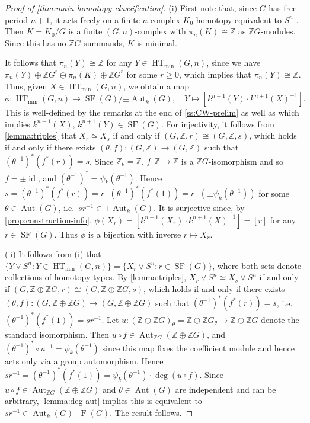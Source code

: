 \documentclass[11pt,leqno,a4paper]{amsart}
\newcommand{\Z}{\mathbb{Z}}
\DeclareMathOperator{\Aut}{Aut}
\DeclareMathOperator{\id}{id}
\DeclareMathOperator{\SF}{SF}
\DeclareMathOperator{\HT}{HT}
\DeclareMathOperator{\FF}{F}
\theoremstyle{definition}
\theoremstyle{remark}
\theoremstyle{custom}
\begin{document}
\begin{proof}[Proof of \cref{thm:main-homotopy-classification}]
(i) First note that, since $G$ has free period $n+1$, it acts freely on a finite $n$-complex $K_0$ homotopy equivalent to $S^n$ \cite{Sw60-II}. Then $K=K_0/G$ is a finite $(G,n)$-complex with $\pi_n(K) \cong \Z$ as $\Z G$-modules. Since this has no $\Z G$-summands, $K$ is minimal. 

It follows that $\pi_n(Y) \cong \Z$ for any $Y \in \HT_{\min}(G,n)$, since we have $\pi_n(Y) \oplus \Z G^r \oplus \pi_n(K) \oplus \Z G^r$ for some $r \ge 0$, which implies that $\pi_n(Y) \cong \Z$. 
Thus, given $X \in \HT_{\min}(G,n)$, we obtain a map 
\[ \phi : \HT_{\min}(G,n) \to \SF(G)/{\pm{\Aut_{k}(G)}}, \quad Y \mapsto [k^{n+1}(Y) \cdot k^{n+1}(X)^{-1}].\] This is well-defined by the remarks at the end of \cref{ss:CW-prelim} as well as \cite[Lemma 7.3]{Sw60-II} which implies $k^{n+1}(X)$, $k^{n+1}(Y) \in \SF(G)$.
For injectivity, it follows from \cref{lemma:triples} that $X_r \simeq X_s$ if and only if  $(G,\Z,r) \cong (G,\Z,s)$, which holds if and only if there exists $(\theta,f) : (G,\Z) \to (G,\Z)$ such that $(\theta^{-1})^*(f^*(r))=s$. Since $\Z_\theta = \Z$, $f : \Z \to \Z$ is a $\Z G$-isomorphism and so $f = \pm \id$, and $(\theta^{-1})^* = \psi_{k}(\theta^{-1})$. Hence $s = (\theta^{-1})^*(f^*(r)) = r \cdot (\theta^{-1})^*(f^*(1)) = r \cdot (\pm \psi_{k}(\theta^{-1}))$ for some $\theta \in \Aut(G)$, i.e.~$sr^{-1} \in \pm{\Aut_{k}(G)}$.
It is surjective since, by \cref{prop:construction-info}, $\phi(X_r) = [k^{n+1}(X_r) \cdot k^{n+1}(X)^{-1}] = [r]$ for any $r \in \SF(G)$.
Thus $\phi$ is a bijection with inverse $r \mapsto X_r$.

(ii) It follows from (i) that $\{Y \vee S^n : Y \in \HT_{\min}(G,n)\} = \{X_r \vee S^n : r \in \SF(G)\}$, where both sets denote collections of homotopy types. By \cref{lemma:triples},  $X_r \vee S^n \simeq X_s \vee S^n$ if and only if $(G,\Z \oplus \Z G,r) \cong (G,\Z \oplus \Z G,s)$, which holds if and only if there exists $(\theta,f) : (G,\Z \oplus \Z G) \to (G,\Z \oplus \Z G)$ such that $(\theta^{-1})^*(f^*(r))=s$, i.e.~$(\theta^{-1})^*(f^*(1))=sr^{-1}$. Let $u : (\Z \oplus \Z G)_\theta = \Z \oplus \Z G_\theta \to \Z \oplus \Z G$ denote the standard isomorphism. Then $u \circ f \in \Aut_{\Z G}(\Z \oplus \Z G)$, and $(\theta^{-1})^* \circ u^{-1} = \psi_{k}(\theta^{-1})$ since this map fixes the coefficient module and hence acts only via a group automorphism. Hence $sr^{-1} = (\theta^{-1})^*(f^*(1)) = \psi_{k}(\theta^{-1}) \cdot \deg(u \circ f)$. Since $u \circ f \in \Aut_{\Z G}(\Z \oplus \Z G)$ and $\theta \in \Aut(G)$ are independent and can be arbitrary, \cref{lemma:deg-aut} implies this is equivalent to $sr^{-1} \in \Aut_{k}(G) \cdot \FF(G)$. The result follows.
\end{proof}
\end{document}
